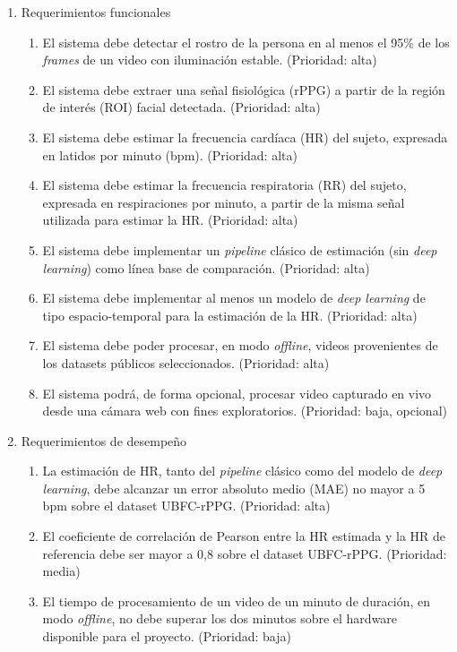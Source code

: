 \documentclass[
11pt, %
]{charter}
\begin{document}
	\begin{enumerate}
		\item Requerimientos funcionales
		\begin{enumerate}
			\item El sistema debe detectar el rostro de la persona en al menos el 95\% de los \textit{frames} de un video con iluminación estable. (Prioridad: alta)
			\item El sistema debe extraer una señal fisiológica (rPPG) a partir de la región de interés (ROI) facial detectada. (Prioridad: alta)
			\item El sistema debe estimar la frecuencia cardíaca (HR) del sujeto, expresada en latidos por minuto (bpm). (Prioridad: alta)
			\item El sistema debe estimar la frecuencia respiratoria (RR) del sujeto, expresada en respiraciones por minuto, a partir de la misma señal utilizada para estimar la HR. (Prioridad: alta)
			\item El sistema debe implementar un \textit{pipeline} clásico de estimación (sin \textit{deep learning}) como línea base de comparación. (Prioridad: alta)
			\item El sistema debe implementar al menos un modelo de \textit{deep learning} de tipo espacio-temporal para la estimación de la HR. (Prioridad: alta)
			\item El sistema debe poder procesar, en modo \textit{offline}, videos provenientes de los datasets públicos seleccionados. (Prioridad: alta)
			\item El sistema podrá, de forma opcional, procesar video capturado en vivo desde una cámara web con fines exploratorios. (Prioridad: baja, opcional)
		\end{enumerate}
		\item Requerimientos de desempeño
		\begin{enumerate}
			\item La estimación de HR, tanto del \textit{pipeline} clásico como del modelo de \textit{deep learning}, debe alcanzar un error absoluto medio (MAE) no mayor a 5 bpm sobre el dataset UBFC-rPPG. (Prioridad: alta)
			\item El coeficiente de correlación de Pearson entre la HR estimada y la HR de referencia debe ser mayor a 0,8 sobre el dataset UBFC-rPPG. (Prioridad: media)
			\item El tiempo de procesamiento de un video de un minuto de duración, en modo \textit{offline}, no debe superar los dos minutos sobre el hardware disponible para el proyecto. (Prioridad: baja)

\end{enumerate}
\end{enumerate}
\end{document}
